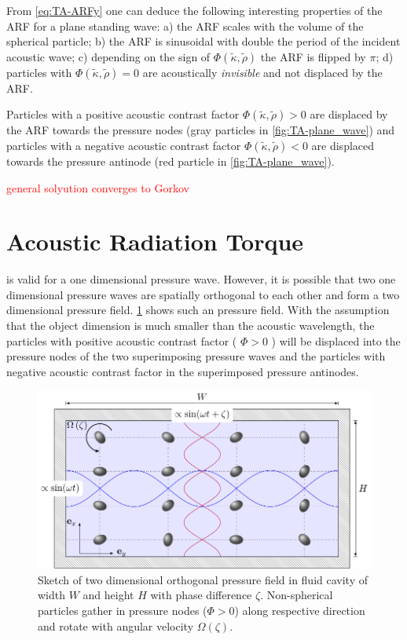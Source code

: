 From \cref{eq:TA-ARFy} one can deduce the following interesting properties of 
the ARF for a plane standing wave: a) the ARF scales with the volume of the 
spherical particle; b) the ARF is sinusoidal with double the period of the 
incident acoustic wave; c) depending on the sign of $\Phi(\tilde{\kappa}, 
\tilde{\rho})$ the ARF is flipped by $\pi$; d) particles with 
$\Phi(\tilde{\kappa}, \tilde{\rho}) = 0$ are acoustically \emph{invisible} and 
not displaced by the ARF.

Particles with a positive acoustic contrast factor $\Phi(\tilde{\kappa}, 
\tilde{\rho}) > 0$ are displaced by the ARF towards the pressure nodes (gray 
particles in \cref{fig:TA-plane_wave}) and particles with a negative acoustic 
contrast factor $\Phi(\tilde{\kappa}, \tilde{\rho}) < 0$ are displaced towards 
the pressure antinode (red particle in \cref{fig:TA-plane_wave}).

\textcolor{red}{general solyution converges to Gorkov}


\section{Acoustic Radiation Torque\label{sec:TA-VT}}

 is valid for a one dimensional pressure wave. However, it is 
possible that two one dimensional pressure waves are spatially orthogonal to 
each other and form a two dimensional pressure field. 
\cref{fig:TA-viscous_torque} shows such an pressure field. With the assumption 
that the object dimension is much smaller than the acoustic wavelength, the 
particles with positive acoustic contrast factor ( $\Phi>0$ ) will be displaced 
into the pressure nodes of the two superimposing pressure waves and the 
particles with negative acoustic contrast factor in the superimposed pressure 
antinodes.

\begin{figure}[tbp]
  \centering
  \includegraphics[]{External/viscous_torque.pdf}
  \caption{Sketch of two dimensional orthogonal pressure field in fluid cavity 
  of width $W$ and height $H$ with phase difference $\zeta$. Non-spherical 
particles gather in pressure nodes ($\Phi > 0$) along respective direction and 
rotate with angular velocity $\Omega\left( \zeta \right)$.}
  \label{fig:TA-viscous_torque}
\end{figure}

